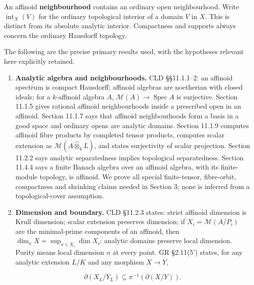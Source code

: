 \documentclass[
  11pt,
]{article}
\begin{document}
An affinoid \textbf{neighbourhood} contains an ordinary open
neighbourhood. Write \(\operatorname{int}_X(V)\) for the ordinary
topological interior of a domain \(V\) in \(X\). This is distinct from
its absolute analytic interior. Compactness and supports always concern
the ordinary Hausdorff topology.

The following are the precise primary results used, with the hypotheses
relevant here explicitly retained.

\begin{enumerate}
\def\labelenumi{\arabic{enumi}.}
\item
  \textbf{Analytic algebra and neighbourhoods.} CLD §§11.1.1--2: an
  affinoid spectrum is compact Hausdorff; affinoid algebras are
  noetherian with closed ideals; for a \(k\)-affinoid algebra \(A\),
  \(\mathcal M(A)\to\operatorname{Spec}A\) is surjective. Section 11.1.5
  gives rational affinoid neighbourhoods inside a prescribed open in an
  affinoid. Section 11.1.7 says that affinoid neighbourhoods form a
  basis in a good space and ordinary opens are analytic domains. Section
  11.1.9 computes affinoid fibre products by completed tensor products,
  computes scalar extension as \(\mathcal M(A\widehat\otimes_k L)\), and
  states surjectivity of scalar projection. Section 11.2.2 says analytic
  separatedness implies topological separatedness. Section 11.4.4 says a
  finite Banach algebra over an affinoid algebra, with its finite-module
  topology, is affinoid. We prove all special finite-tensor,
  fibre-orbit, compactness and shrinking claims needed in Section 3;
  none is inferred from a topological-cover assumption.
\item
  \textbf{Dimension and boundary.} CLD §11.2.3 states: strict affinoid
  dimension is Krull dimension; scalar extension preserves dimension; if
  \(X_i=\mathcal M(A/P_i)\) are the minimal-prime components of an
  affinoid, then \(\dim_xX=\sup_{x\in X_i}\dim X_i\); analytic domains
  preserve local dimension. Purity means local dimension \(n\) at every
  point. GR §2.11(5') states, for any analytic extension \(L/K\) and any
  morphism \(X\to Y\),

  \[\partial(X_L/Y_L)\subseteq\pi^{-1}(\partial(X/Y)).\]


\end{enumerate}
\end{document}
